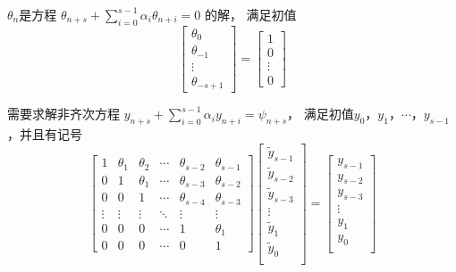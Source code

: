 \documentclass[a4paper]{article}
\begin{document}
\par $\theta_n$是方程 
$\theta_{n+s}+\displaystyle\sum_{i=0}^{s-1}\alpha_i\theta_{n+i}=0$ 的解，
满足初值
\begin{equation}
    \begin{bmatrix}
        \theta_0\\
        \theta_{-1}\\
        \vdots\\
        \theta_{-s+1}
    \end{bmatrix}
    =
    \begin{bmatrix}
        1\\
        0\\
        \vdots\\
        0
    \end{bmatrix}
\end{equation}
\par 需要求解非齐次方程 $y_{n+s}+\displaystyle\sum_{i=0}^{s-1}\alpha_iy_{n+i}=\psi_{n+s}$，
满足初值$y_0$，$y_{1}$，$\cdots$，$y_{s-1}$，并且有记号
\begin{equation}
    \begin{bmatrix}
        1 & \theta_1 & \theta_2 & \cdots & \theta_{s-2} & \theta_{s-1}\\
        0 & 1 & \theta_1 & \cdots & \theta_{s-3} & \theta_{s-2}\\
        0 & 0 & 1 & \cdots & \theta_{s-4} & \theta_{s-3}\\
        \vdots & \vdots & \vdots & \ddots & \vdots & \vdots\\
        0 & 0 & 0 & \cdots & 1 & \theta_1\\
        0 & 0 & 0 & \cdots & 0 & 1
    \end{bmatrix}
    \begin{bmatrix}
        \tilde{y}_{s-1}\\
        \tilde{y}_{s-2}\\
        \tilde{y}_{s-3}\\
        \vdots\\
        \tilde{y}_{1}\\
        \tilde{y}_{0}\\
    \end{bmatrix}
    =
    \begin{bmatrix}
        y_{s-1}\\
        y_{s-2}\\
        y_{s-3}\\
        \vdots\\
        y_{1}\\
        y_{0}\\
    \end{bmatrix}
\end{equation}
\end{document}
